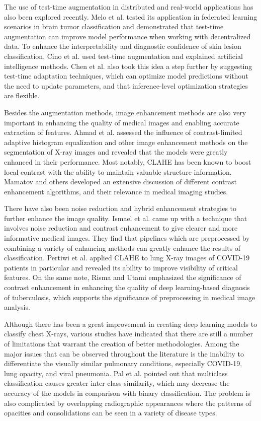 \documentclass[a4paper,fleqn]{cas-dc}
\begin{document}
The use of test-time augmentation in distributed and real-world applications has also been explored recently. Melo et al. \cite{ref8} tested its application in federated learning scenarios in brain tumor classification and demonstrated that test-time augmentation can improve model performance when working with decentralized data. To enhance the interpretability and diagnostic confidence of skin lesion classification, Cino et al. \cite{ref9} used test-time augmentation and explained artificial intelligence methods. Chen et al. \cite{ref10} also took this idea a step further by suggesting test-time adaptation techniques, which can optimize model predictions without the need to update parameters, and that inference-level optimization strategies are flexible.

Besides the augmentation methods, image enhancement methods are also very important in enhancing the quality of medical images and enabling accurate extraction of features. Ahmad et al. \cite{ref11} assessed the influence of contrast-limited adaptive histogram equalization and other image enhancement methods on the segmentation of X-ray images and revealed that the models were greatly enhanced in their performance. Most notably, CLAHE has been known to boost local contrast with the ability to maintain valuable structure information. Mamatov and others \cite{ref12} developed an extensive discussion of different contrast enhancement algorithms, and their relevance in medical imaging studies.

There have also been noise reduction and hybrid enhancement strategies to further enhance the image quality. Ismael et al. \cite{ref13} came up with a technique that involves noise reduction and contrast enhancement to give clearer and more informative medical images. They find that pipelines which are preprocessed by combining a variety of enhancing methods can greatly enhance the results of classification. Pertiwi et al. \cite{ref14} applied CLAHE to lung X-ray images of COVID-19 patients in particular and revealed its ability to improve visibility of critical features. On the same note, Risma and Utami \cite{ref15} emphasized the significance of contrast enhancement in enhancing the quality of deep learning-based diagnosis of tuberculosis, which supports the significance of preprocessing in medical image analysis.

Although there has been a great improvement in creating deep learning models to classify chest X-rays, various studies have indicated that there are still a number of limitations that warrant the creation of better methodologies. Among the major issues that can be observed throughout the literature is the inability to differentiate the visually similar pulmonary conditions, especially COVID-19, lung opacity, and viral pneumonia. Pal et al. \cite{ref1} pointed out that multiclass classification causes greater inter-class similarity, which may decrease the accuracy of the models in comparison with binary classification. The problem is also complicated by overlapping radiographic appearances where the patterns of opacities and consolidations can be seen in a variety of disease types.
\end{document}
